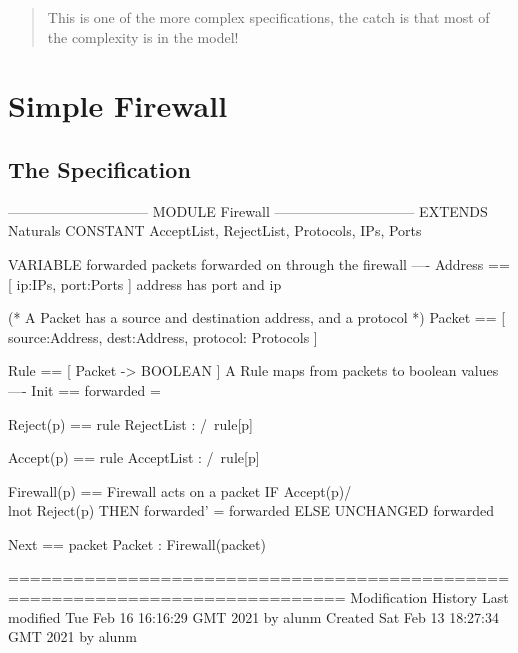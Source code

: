 \documentclass[12pt]{article}
\begin{document}
\begin{abstract}
	This is one of the more complex specifications,  the catch is that most of
	the complexity is in the model!
\end{abstract}

\section{Simple Firewall}
\subsection{The Specification} 
\begin{tla}
------------------------------ MODULE Firewall ------------------------------
EXTENDS Naturals
CONSTANT AcceptList,
         RejectList,
         Protocols,
         IPs,
         Ports

VARIABLE forwarded \* packets forwarded on through the firewall
----
Address == [ ip:IPs, port:Ports ] \* address has port and ip

(*
A Packet has a source and destination address,
and a protocol
*)
Packet  == [ source:Address,
             dest:Address,
             protocol: Protocols ]

Rule == [ Packet -> BOOLEAN ] \* A Rule maps from packets to boolean values
----
Init == forwarded = {}

Reject(p) ==
    \E rule \in RejectList :
        /\ rule[p]

Accept(p) ==
    \E rule \in AcceptList :
        /\ rule[p]

Firewall(p) == \* Firewall acts on a packet
    IF Accept(p)/\\lnot Reject(p) 
    THEN forwarded' = forwarded 
    ELSE UNCHANGED forwarded
    
Next ==
    \E packet \in Packet : Firewall(packet)

=============================================================================
\* Modification History
\* Last modified Tue Feb 16 16:16:29 GMT 2021 by alunm
\* Created Sat Feb 13 18:27:34 GMT 2021 by alunm
\end{tla}
\end{document}
